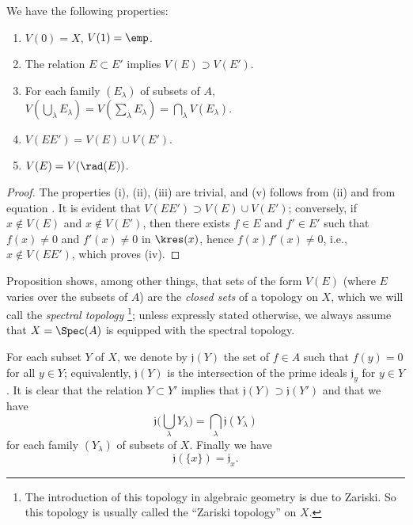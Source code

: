 \begin{proposition}[1.1.2]
\label{I.1.1.2}
We have the following properties:
\begin{enumerate}
  \item[{\rm(i)}] $V(0)=X$, $V(1)=\emp$.
  \item[{\rm(ii)}] The relation $E\subset E'$ implies $V(E)\supset V(E')$.
  \item[{\rm(iii)}] For each family $(E_\lambda)$ of subsets of $A$, $V(\bigcup_\lambda E_\lambda)=V(\sum_\lambda E_\lambda)=\bigcap_\lambda V(E_\lambda)$.
  \item[{\rm(iv)}] $V(EE')=V(E)\cup V(E')$.
  \item[{\rm(v)}] $V(E)=V(\rad(E))$.
\end{enumerate}
\end{proposition}

\begin{proof}
The properties (i), (ii), (iii) are trivial, and (v) follows from (ii) and from equation .
It is evident that $V(EE')\supset V(E)\cup V(E')$;
conversely, if $x\not\in V(E)$ and $x\not\in V(E')$, then there exists $f\in E$ and $f'\in E'$ such that $f(x)\neq 0$ and $f'(x)\neq 0$ in $\kres(x)$, hence $f(x)f'(x)\neq 0$, i.e., $x\not\in V(EE')$, which proves (iv).
\end{proof}

Proposition  shows, among other things, that sets of the form $V(E)$ (where $E$ varies over the subsets of $A$) are the \emph{closed sets} of a topology on $X$, which we will call the \emph{spectral topology}
\footnote{The introduction of this topology in algebraic geometry is due to Zariski.
So this topology is usually called the ``Zariski topology'' on $X$.};
unless expressly stated otherwise, we always assume that $X=\Spec(A)$ is equipped with the spectral topology.

\begin{env}[1.1.3]
\label{I.1.1.3}
For each subset $Y$ of $X$, we denote by $\mathfrak{j}(Y)$ the set of $f\in A$ such that $f(y)=0$ for all $y\in Y$;
equivalently, $\mathfrak{j}(Y)$ is the intersection of the prime ideals $\mathfrak{j}_y$ for $y\in Y$.
It is clear that the relation $Y\subset Y'$ implies that $\mathfrak{j}(Y)\supset\mathfrak{j}(Y')$ and that we have
\[
  \label{I.1.1.3.1}
  \mathfrak{j}\bigg(\bigcup_\lambda Y_\lambda\bigg)=\bigcap_\lambda\mathfrak{j}(Y_\lambda)
  \tag{1.1.3.1}
\]
for each family $(Y_\lambda)$ of subsets of $X$.
Finally we have
\[
  \label{I.1.1.3.2}
  \mathfrak{j}(\{x\})=\mathfrak{j}_x.
  \tag{1.1.3.2}
\]
\end{env}

